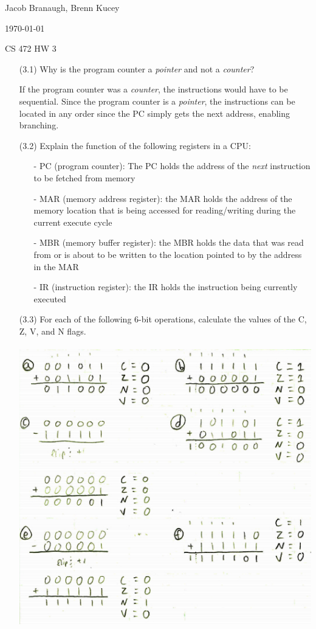 \documentclass[letterpaper,10pt,titlepage]{article}
\def\name{Jacob Branaugh, Brenn Kucey}
\begin{document}
\hfill \name

\hfill \today

\hfill CS 472 HW 3

\begin{enumerate}
	\item[(3.1)] Why is the program counter a \textit{pointer} and not a
		\textit{counter}?
	\item[\textbullet] If the program counter was a \textit{counter}, the instructions
		would have to be sequential. Since the program counter is a
		\textit{pointer}, the instructions can be located in any order since the
		PC simply gets the next address, enabling branching.

	\item[(3.2)] Explain the function of the following registers in a CPU:
	\begin{enumerate}
		\item[-] PC (program counter): The PC holds the address of the
			\textit{next} instruction to be fetched from memory
		\item[-] MAR (memory address register): the MAR holds the address of the
			memory location that is being accessed for reading/writing during 
			the current execute cycle
		\item[-] MBR (memory buffer register): the MBR holds the data that was
			read from or is about to be written to the location pointed to by
			the address in the MAR
		\item[-] IR (instruction register): the IR holds the instruction being
			currently executed
	\end{enumerate}

	\item[(3.3)] For each of the following 6-bit operations, calculate the values of
		the C, Z, V, and N flags.
		\\
		\\
		\includegraphics[scale=0.5]{problem3.jpg}


\end{enumerate}
\end{document}
